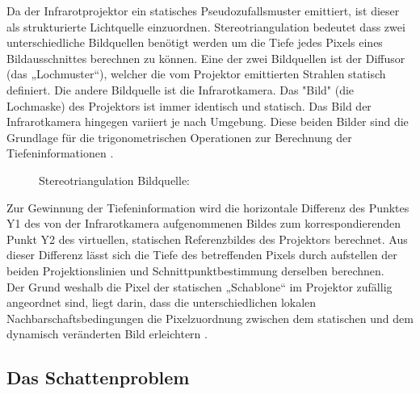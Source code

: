 Da der Infrarotprojektor ein statisches Pseudozufallsmuster emittiert, ist dieser als strukturierte Lichtquelle einzuordnen.
Stereotriangulation bedeutet dass zwei unterschiedliche Bildquellen benötigt werden um die Tiefe jedes Pixels eines Bildausschnittes berechnen zu können.
Eine der zwei Bildquellen ist der Diffusor (das „Lochmuster“), welcher die vom Projektor emittierten Strahlen statisch definiert. Die andere Bildquelle ist die Infrarotkamera.
Das "Bild" (die Lochmaske) des Projektors ist immer identisch und statisch. Das Bild der Infrarotkamera hingegen variiert je nach Umgebung. Diese beiden Bilder sind die Grundlage für die trigonometrischen Operationen zur Berechnung der Tiefeninformationen .

\begin{figure}[!ht]
  \centering
   \caption{ Stereotriangulation Bildquelle:\cite{stereotriangluation}}
\end{figure}
Zur Gewinnung der Tiefeninformation wird die horizontale Differenz des Punktes Y1 des von der Infrarotkamera aufgenommenen Bildes zum korrespondierenden Punkt Y2 des virtuellen, statischen Referenzbildes des Projektors berechnet. Aus dieser Differenz lässt sich die Tiefe des betreffenden Pixels durch aufstellen der beiden Projektionslinien und Schnittpunktbestimmung derselben berechnen. \\
Der Grund weshalb die Pixel der statischen „Schablone“ im Projektor zufällig angeordnet sind, liegt darin, dass die unterschiedlichen lokalen Nachbarschaftsbedingungen die Pixelzuordnung zwischen dem statischen und dem dynamisch veränderten Bild erleichtern \cite{primesense}.


\subsection{Das Schattenproblem}

